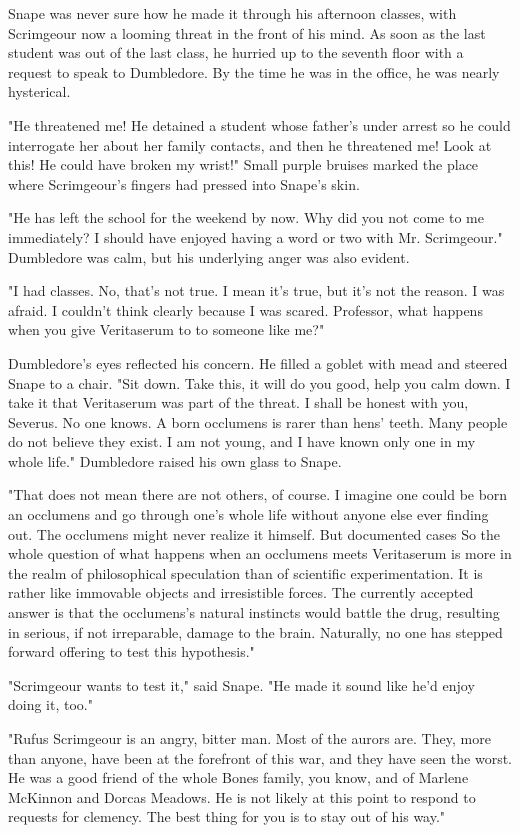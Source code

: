 Snape was never sure how he made it through his afternoon classes, with Scrimgeour now a looming threat in the front of his mind. As soon as the last student was out of the last class, he hurried up to the seventh floor with a request to speak to Dumbledore. By the time he was in the office, he was nearly hysterical.

"He threatened me! He detained a student whose father's under arrest so he could interrogate her about her family contacts, and then he threatened me! Look at this! He could have broken my wrist!" Small purple bruises marked the place where Scrimgeour's fingers had pressed into Snape's skin.

"He has left the school for the weekend by now. Why did you not come to me immediately? I should have enjoyed having a word or two with Mr. Scrimgeour." Dumbledore was calm, but his underlying anger was also evident.

"I had classes. No, that's not true. I mean it's true, but it's not the reason. I was afraid. I couldn't think clearly because I was scared. Professor, what happens when you give{\el} Veritaserum to{\el} to someone like me?"

Dumbledore's eyes reflected his concern. He filled a goblet with mead and steered Snape to a chair. "Sit down. Take this, it will do you good, help you calm down. I take it that Veritaserum was part of the threat. I shall be honest with you, Severus. No one knows. A born occlumens is rarer than hens' teeth. Many people do not believe they exist. I am not young, and I have known only one in my whole life." Dumbledore raised his own glass to Snape.

"That does not mean there are not others, of course. I imagine one could be born an occlumens and go through one's whole life without anyone else ever finding out. The occlumens might never realize it himself. But documented cases{\el} So the whole question of what happens when an occlumens meets Veritaserum is more in the realm of philosophical speculation than of scientific experimentation. It is rather like immovable objects and irresistible forces. The currently accepted answer is that the occlumens's natural instincts would battle the drug, resulting in serious, if not irreparable, damage to the brain. Naturally, no one has stepped forward offering to test this hypothesis."

"Scrimgeour wants to test it," said Snape. "He made it sound like he'd enjoy doing it, too."

"Rufus Scrimgeour is an angry, bitter man. Most of the aurors are. They, more than anyone, have been at the forefront of this war, and they have seen the worst. He was a good friend of the whole Bones family, you know, and of Marlene McKinnon and Dorcas Meadows. He is not likely at this point to respond to requests for clemency. The best thing for you is to stay out of his way."

